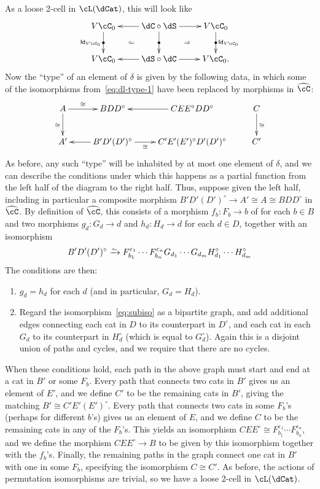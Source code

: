 \documentclass{amsart}
\let\oc\circ
\newcommand{\C}{\cC}
\renewcommand{\Chat}{\ensuremath{\widehat{\C}}\xspace}
\newcommand{\hunit}[1]{\Id_{#1}}
\newcommand{\dl}{\delta}
\renewcommand{\o}{^{\circ}}
\newcommand{\e}[1][]{^{\varepsilon_{#1}}}
\newcommand{\Id}{\mathsf{Id}}
\begin{document}
As a loose 2-cell in $\cL(\dCat)$, this will look like
\[ \xymatrix{ V\C_0 \ar[d]|{\bullet}_{\hunit {V\C_0}} \ar@{}[dr]|{\Leftarrow} &
  \dC\oc \dS \ar[l] \ar[d]|{\bullet} \ar[r] \ar@{}[dr]|{\Rightarrow} &
  V\C_0 \ar[d]|{\bullet}^{\hunit {V\C_0}}\\
  V\C_0 & \dS\oc\dC \ar[l] \ar[r] & V\C_0. } \]
Now the ``type'' of an element of $\dl$ is given by the following data, in which some of the isomorphisms from~\eqref{eq:dl-type-1} have been replaced by morphisms in $\Chat$:
\[ \xymatrix{ A \ar[d]_\cong \ar[r]^-\cong & B D D\o & C E E\o D D\o \ar[l] & C \ar[d]^\cong \\
   A' & B' D' (D')\o \ar[l] \ar[r]_-\cong & C' E' (E')\o D' (D')\o & C' }\]
As before, any such ``type'' will be inhabited by at most one element of $\dl$, and we can describe the conditions under which this happens as a partial function from the left half of the diagram to the right half.
Thus, suppose given the left half, including in particular a composite morphism $B' D' (D')\o \to A'\cong A \cong B D D\o$ in $\Chat$.
By definition of $\Chat$, this consists of a morphism $f_b:F_b \to b$ of \C for each $b\in B$ and two morphisms $g_d:G_d\to d$ and $h_d:H_d \to d$ for each $d\in D$, together with an isomorphism
\begin{equation}\label{eq:subiso}
  B' D' (D')\o \toiso F_{b_1}\e[1]\cdots F_{b_n}\e[n] G_{d_1}\cdots G_{d_m} H_{d_1}\o \cdots H_{d_m}\o
\end{equation}
The conditions are then:
\begin{enumerate}
\item $g_d = h_d$ for each $d$ (and in particular, $G_d = H_d$).
\item Regard the isomorphism~\eqref{eq:subiso} as a bipartite graph, and add additional edges connecting each cat in $D$ to its counterpart in $D\o$, and each cat in each $G_d$ to its counterpart in $H_d\o$ (which is equal to $G_d\o$).
  Again this is a disjoint union of paths and cycles, and we require that there are no cycles.
\end{enumerate}
When these conditions hold, each path in the above graph must start and end at a cat in $B'$ or some $F_b$.
Every path that connects two cats in $B'$ gives us an element of $E'$, and we define $C'$ to be the remaining cats in $B'$, giving the matching $B' \cong C' E' (E')\o$.
Every path that connects two cats in some $F_b$'s (perhaps for different $b$'s) gives us an element of $E$, and we define $C$ to be the remaining cats in any of the $F_b$'s.
This yields an isomorphism $C E E\o \cong F_{b_1}\e[1]\cdots F_{b_n}\e[n]$, and we define the morphism $C E E\o \to B$ to be given by this isomorphism together with the $f_b$'s.
Finally, the remaining paths in the graph connect one cat in $B'$ with one in some $F_b$, specifying the isomorphism $C\cong C'$.
As before, the actions of permutation isomorphisms are trivial, so we have a loose 2-cell in $\cL(\dCat)$.
\end{document}
